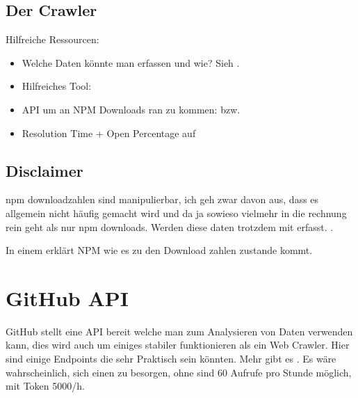 


\subsection{Der Crawler}

Hilfreiche Ressourcen:

\begin{itemize}
    \item Welche Daten könnte man erfassen und wie? Sieh .
    \item Hilfreiches Tool: 
    \item API um an NPM Downloads ran zu kommen:
          bzw.
    \item Resolution Time + Open Percentage auf 
\end{itemize}



\subsection{Disclaimer}

npm downloadzahlen sind manipulierbar, ich geh zwar davon aus, dass es allgemein nicht häufig gemacht wird
und da ja sowieso vielmehr in die rechnung rein geht als nur npm downloads. Werden diese daten trotzdem mit erfasst.
.

In einem 
erklärt NPM wie es zu den Download zahlen zustande kommt.


\section{GitHub API}
GitHub stellt eine API bereit welche man zum Analysieren von Daten verwenden kann, dies wird auch um
einiges stabiler funktionieren als ein Web Crawler. Hier sind einige Endpoints die sehr Praktisch sein könnten.
Mehr gibt es . Es wäre wahrscheinlich, sich
einen 
zu besorgen, ohne sind 60 Aufrufe pro Stunde möglich, mit Token 5000/h.

